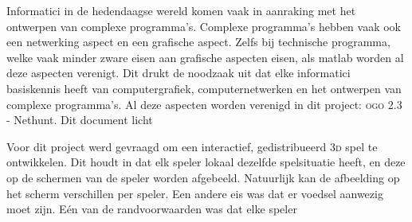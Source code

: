 Informatici in de hedendaagse wereld komen vaak in aanraking met het ontwerpen van complexe programma's. Complexe programma's hebben vaak ook een netwerking aspect en een grafische aspect. Zelfs bij technische programma, welke vaak minder zware eisen aan grafische aspecten eisen, als matlab worden al deze aspecten verenigt. Dit drukt de noodzaak uit dat elke informatici basiskennis heeft van computergrafiek, computernetwerken en het ontwerpen van complexe programma's. Al deze aspecten worden verenigd in dit project: \textsc{ogo} 2.3 - Nethunt. Dit document licht 

Voor dit project werd gevraagd om een interactief, gedistribueerd 3\textsc{d} spel te ontwikkelen. Dit houdt in dat elk speler lokaal dezelfde spelsituatie heeft, en deze op de schermen van de speler worden afgebeeld. Natuurlijk kan de afbeelding op het scherm verschillen per speler. Een andere eis was dat er voedsel aanwezig moet zijn. E\'en van de randvoorwaarden was dat elke speler 